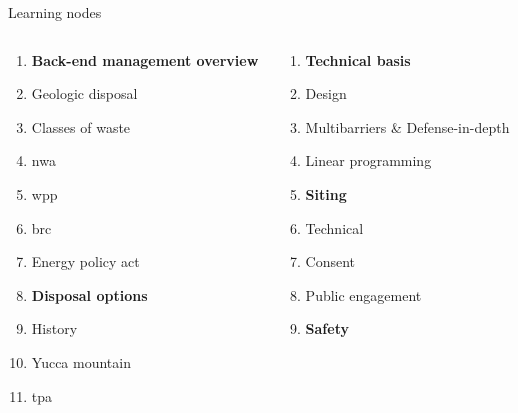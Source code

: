 \documentclass[aspectratio=1610,pdftex,dvipsnames,compress,xcolor={dvipsnames}]{beamer}
\newcommand{\acf}{\acrfull} %
\begin{document}
\begin{frame}{Learning nodes}
    \begin{columns}[t]

        \begin{column}{0.50\textwidth}
            \begin{enumerate}[series=outerlist,topsep=0pt,itemsep=1pt,leftmargin=*,label=(\arabic*)]
                \item[]\textbf{Back-end management overview}
                \item[]Geologic disposal
                \item[]Classes of waste
                \item[]\acf{nwa}
                \item[]\acf{wpp}
                \item[]\acf{brc}
                \item[]Energy policy act
                    \vspace{0.15in}
                \item[]\textbf{Disposal options}
                \item[]History
                \item[]Yucca mountain
                \item[]\acf{tpa}
            \end{enumerate}
        \end{column}

        \begin{column}{0.50\textwidth}
            \begin{enumerate}[series=outerlist,topsep=0pt,itemsep=1pt,leftmargin=*,label=(\arabic*)]
                \item[]\textbf{Technical basis}
                \item[]Design
                \item[]Multibarriers \& Defense-in-depth
                \item[]Linear programming
                    \vspace{0.15in}
                \item[]\textbf{Siting}
                \item[]Technical
                \item[]Consent
                \item[]Public engagement
                    \vspace{0.15in}
                \item[]\textbf{Safety}
            \end{enumerate}
        \end{column}

    \end{columns}
\end{frame}
\end{document}
